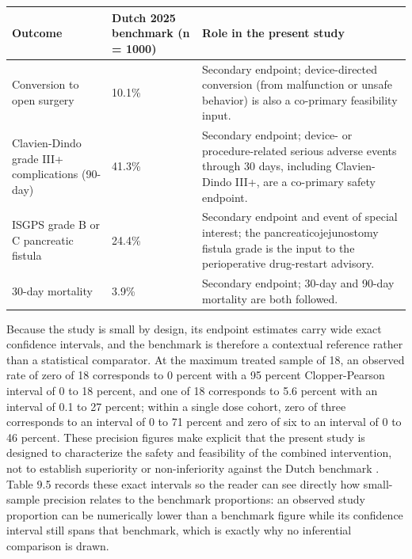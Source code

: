\noindent\begin{tabularx}{\textwidth}{L{4.6cm} C{2.6cm} Y}
\toprule
\textbf{Outcome} & \textbf{Dutch 2025 benchmark (n = 1000)} & \textbf{Role in the present study} \\
\midrule
Conversion to open surgery & 10.1\% & Secondary endpoint; device-directed conversion (from malfunction or unsafe behavior) is also a co-primary feasibility input. \\
Clavien-Dindo grade III+ complications (90-day) & 41.3\% & Secondary endpoint; device- or procedure-related serious adverse events through 30 days, including Clavien-Dindo III+, are a co-primary safety endpoint. \\
ISGPS grade B or C pancreatic fistula & 24.4\% & Secondary endpoint and event of special interest; the pancreaticojejunostomy fistula grade is the input to the perioperative drug-restart advisory. \\
30-day mortality & 3.9\% & Secondary endpoint; 30-day and 90-day mortality are both followed. \\
\bottomrule
\end{tabularx}
\vspace{-0.2cm}

Because the study is small by design, its endpoint estimates carry wide exact
confidence intervals, and the benchmark is therefore a contextual reference rather
than a statistical comparator. At the maximum treated sample of 18, an observed
rate of zero of 18 corresponds to 0 percent with a 95 percent Clopper-Pearson
interval of 0 to 18 percent, and one of 18 corresponds to 5.6 percent with an
interval of 0.1 to 27 percent; within a single dose cohort, zero of three
corresponds to an interval of 0 to 71 percent and zero of six to an interval of 0
to 46 percent. These precision figures make explicit that the present study is
designed to characterize the safety and feasibility of the combined intervention,
not to establish superiority or non-inferiority against the Dutch benchmark
\cite{phase1guidance}. Table 9.5 records these exact intervals so the reader can
see directly how small-sample precision relates to the benchmark proportions: an
observed study proportion can be numerically lower than a benchmark figure while
its confidence interval still spans that benchmark, which is exactly why no
inferential comparison is drawn.


